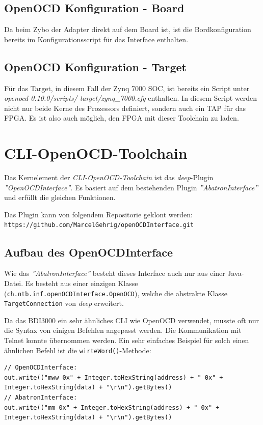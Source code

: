 \subsection{OpenOCD Konfiguration - Board}
Da beim Zybo der Adapter direkt auf dem Board ist, ist die Bordkonfiguration bereits im Konfigurationsscript für das Interface enthalten.

\subsection{OpenOCD Konfiguration - Target}
Für das Target, in diesem Fall der Zynq 7000 SOC, ist bereits ein Script unter \textit{openocd-0.10.0/scripts/ target/zynq\_7000.cfg} enthalten.
In diesem Script werden nicht nur beide Kerne des Prozessors definiert, sondern auch ein TAP für das FPGA.
Es ist also auch möglich, den FPGA mit dieser Toolchain zu laden.


\section{CLI-OpenOCD-Toolchain}
\label{section:CLI-OpenOCD-Toolchain}
Das Kernelement der \textit{CLI-OpenOCD-Toolchain} ist das \textit{deep}-Plugin \textit{''OpenOCDInterface''}.
Es basiert auf dem bestehenden Plugin \textit{''AbatronInterface''} und erfüllt die gleichen Funktionen.

Das Plugin kann von folgendem Repositorie geklont werden:\\
\texttt{https://github.com/MarcelGehrig/openOCDInterface.git}


\subsection{Aufbau des OpenOCDInterface}
Wie das \textit{''AbatronInterface''} besteht dieses Interface auch nur aus einer Java-Datei.
Es besteht aus einer einzigen Klasse (\texttt{ch.ntb.inf.openOCDInterface.OpenOCD}), welche die abstrakte Klasse \texttt{TargetConnection} von \textit{deep} erweitert.

Da das BDI3000 ein sehr ähnliches CLI wie OpenOCD verwendet, musste oft nur die Syntax von einigen Befehlen angepasst werden.
Die Kommunikation mit Telnet konnte übernommen werden.
Ein sehr einfaches Beispiel für solch einen ähnlichen Befehl ist die \texttt{wirteWord()}-Methode:

\lstset{language=java}
\begin{lstlisting}
// OpenOCDInterface:
out.write(("mww 0x" + Integer.toHexString(address) + " 0x" + Integer.toHexString(data) + "\r\n").getBytes()
// AbatronInterface:
out.write(("mm 0x" + Integer.toHexString(address) + " 0x" + Integer.toHexString(data) + "\r\n").getBytes()
\end{lstlisting}


